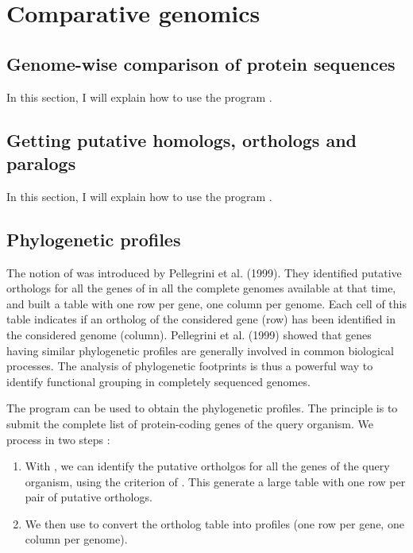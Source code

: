 \section{Comparative genomics}

\subsection{Genome-wise comparison of protein sequences}

In this section, I will explain how to use the program
.

\subsection{Getting putative homologs, orthologs and paralogs}

In this section, I will explain how to use the program
.

\subsection{Phylogenetic profiles}

The notion of  was introduced by
Pellegrini et al. (1999). They identified putative orthologs for all
the genes of  in all the complete genomes
available at that time, and built a table with one row per gene, one
column per genome. Each cell of this table indicates if an ortholog of
the considered gene (row) has been identified in the considered genome
(column). Pellegrini et al. (1999) showed that genes having similar
phylogenetic profiles are generally involved in common biological
processes. The analysis of phylogenetic footprints is thus a powerful
way to identify functional grouping in completely sequenced genomes.

The program  can be used to obtain the
phylogenetic profiles. The principle is to submit the complete list of
protein-coding genes of the query organism. We process in two steps : 

\begin{enumerate}

\item With , we can identify the putative
  ortholgos for all the genes of the query organism, using the
  criterion of . This generate a
  large table with one row per pair of putative orthologs.

\item We then use  to convert the ortholog
  table into profiles (one row per gene, one column per genome).

\end{enumerate}

